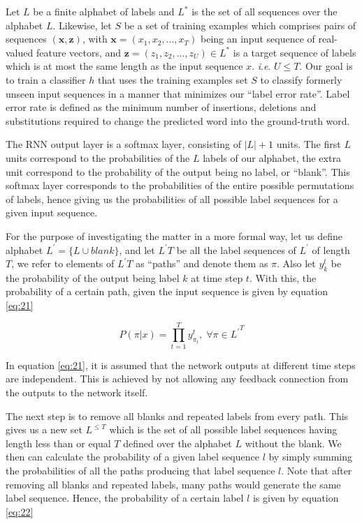 Let $L$ be a finite alphabet of labels and $L^*$ is the set of all sequences over the alphabet $L$. Likewise, let $S$ be a set of training examples which comprises pairs of sequences $(\mathbf{x},\mathbf{z})$, with $\mathbf{x} = (x_1, x_2,..., x_T)$ being an input sequence of real-valued feature vectors, and $\mathbf{z} = (z_1, z_2,..., z_U) \in L^*$ is a target sequence of labels which is at most the same length as the input sequence $x$. \textit{i}.\textit{e}. $U \leq T$. Our goal is to train a classifier $h$ that uses the training examples set $S$ to classify formerly unseen input sequences in a manner that minimizes our \enquote{label error rate}. Label error rate is defined as the minimum number of insertions, deletions and substitutions required to change the predicted word into the ground-truth word.

The \ac{RNN} output layer is a softmax layer, consisting of $|L|+1$ units. The first $L$ units correspond to the probabilities of the $L$ labels of our alphabet, the extra unit correspond to the probability of the output being no label, or \enquote{blank}. This softmax layer corresponds to the probabilities of the entire possible permutations of labels, hence giving us the probabilities of all possible label sequences for a given input sequence.


For the purpose of investigating the matter in a more formal way, let us define alphabet $L^{'} = \{L \cup {blank}\}$, and let ${L^{'}T}$ be all the label sequences of $L^{'}$ of length $T$, we refer to elements of ${L^{'}T}$ as \enquote{paths} and denote them as $\pi$. Also let $y_{k}^{t}$ be the probability of the output being label $k$ at time step $t$. With this, the probability of a certain path, given the input sequence is given by equation \ref{eq:21}

\begin{equation}
\label{eq:21}
P(\pi|x) = \prod_{t=1}^{T} y_{\pi_t}^{t}, \; \forall \pi \in {{L^{'}}^T}
\end{equation}

In equation \ref{eq:21}, it is assumed that the network outputs at different time steps are independent. This is achieved by not allowing any feedback connection from the outputs to the network itself.

The next step is to remove all blanks and repeated labels from every path. This gives us a new set $L^{\leq T}$ which is the set of all possible label sequences having length less than or equal $T$ defined over the alphabet $L$ without the blank. We then can calculate the probability of a given label sequence $l$ by simply summing the probabilities of all the paths producing that label sequence $l$. Note that after removing all blanks and repeated labels, many paths would generate the same label sequence. Hence, the probability of a certain label $l$ is given by equation \ref{eq:22}

